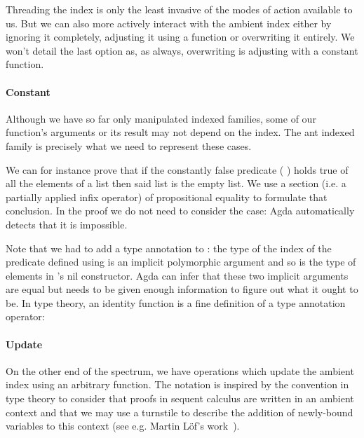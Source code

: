Threading the index is only the least invasive of the modes of action
available to us. But we can also more actively interact with the ambient
index either by ignoring it completely, adjusting it using a function
or overwriting it entirely. We won't detail the last option as, as always,
overwriting is adjusting with a constant function.

\paragraph{Constant} Although we have so far only manipulated indexed families,
some of our function's arguments or its result may not depend on the index.
The ant indexed family is precisely what we need to represent
these cases.


We can for instance prove that if the constantly false predicate
{( )} holds true of all the elements of a list then
said list is the empty list. We use a section (i.e. a partially applied
infix operator) of propositional equality to formulate that conclusion.
In the proof we do not need to consider the  case: Agda
automatically detects that it is impossible.


Note that we had to add a type annotation to \AIC{[]}: the type of the
index of the predicate defined using  is an implicit polymorphic
argument and so is the type of elements in 's nil constructor.
Agda can infer that these two implicit arguments are equal but needs to be
given enough information to figure out what it ought to be. In type theory,
an identity function is a fine definition of a type annotation operator:


\paragraph{Update} On the other end of the spectrum, we have operations
which update the ambient index using an arbitrary function. The notation
 is inspired by the convention in type theory to consider that
proofs in sequent calculus are written in an ambient context and that we
may use a turnstile to describe the addition of newly-bound variables to
this context (see e.g. Martin L\"of's work~\cite{martin1982constructive}).


